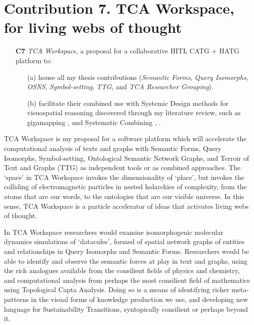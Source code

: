 \section{Contribution 7. TCA Workspace, for living webs of thought}
\FloatBarrier  
\begin{enumerate}
      \item[\textbf{C7}] \textit{TCA Workspace}, a proposal for a collaborative HITL CATG + HATG platform to:
    \begin{enumerate}
        \item[(a)] house all my thesis contributions (\textit{Semantic Forms}, \textit{Query Isomorphs}, \textit{OSNS}, \textit{Symbol-setting}, \textit{TTG}, and \textit{TCA Researcher Grouping}).
        \item[(b)] facilitate their combined use with Systemic Design methods for visuospatial reasoning discovered through my literature review, such as gigamapping \citep{sevaldson_giga-mapping_2011}, \citep[p.~26]{sevaldson_designing_2022} and Systematic Combining \citep[p.~554]{dubois_systematic_2002}, \citep{kjode_entanglement_2024}.
    \end{enumerate}
\end{enumerate}
\FloatBarrier  
{}


TCA Workspace is my proposal for a software platform which will accelerate the computational analysis of texts and graphs with Semantic Forms, Query Isomorphs, Symbol-setting, Ontological Semantic Network Graphs, and Terroir of Text and Graphs (TTG) as independent tools or as combined approaches. The ‘space’ in TCA Workspace invokes the dimensionality of ‘place’, but invokes the colliding of electromagnetic particles in nested holarchies of complexity, from the atoms that are our words, to the ontologies that are our visible universe. In this sense, TCA Workspace is a particle accelerator of ideas that activates living webs of thought.

In TCA Workspace researchers would examine isomorphogenic molecular dynamics simulations of ‘datacules’, formed of spatial network graphs of entities and relationships in Query Isomorphs and Semantic Forms. Researchers would be able to identify and observe the semantic forces at play in text and graphs, using the rich analogues available from the consilient fields of physics and chemistry, and computational analysis from perhaps the most consilient field of mathematics using Topological Capta Analysis. Doing so is a means of identifying richer meta-patterns in the visual forms of knowledge production we use, and developing new language for Sustainability Transitions, syntopically consilient or perhaps beyond it. 

